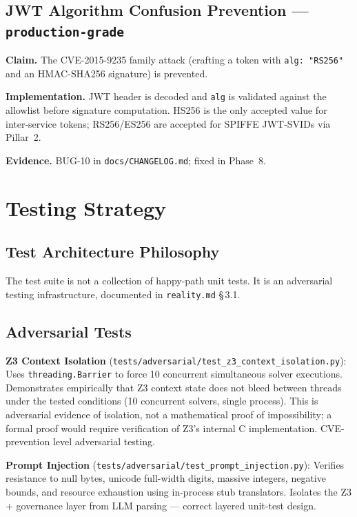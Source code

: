 \documentclass[12pt,a4paper,oneside]{report}
\newcommand{\fname}[1]{\texttt{#1}}          %
\newcommand{\code}[1]{\texttt{#1}}           %
\newcommand{\cfrsec}[1]{\S\,#1}             %
\begin{document}
\section{JWT Algorithm Confusion Prevention --- \code{production-grade}}

\textbf{Claim.}  The CVE-2015-9235 family attack (crafting a token with
\code{alg: "RS256"} and an HMAC-SHA256 signature) is prevented.

\textbf{Implementation.}  JWT header is decoded and \code{alg} is validated
against the allowlist before signature computation.  HS256 is the only
accepted value for inter-service tokens; RS256/ES256 are accepted for
SPIFFE JWT-SVIDs via Pillar~2.

\textbf{Evidence.}  BUG-10 in \fname{docs/CHANGELOG.md}; fixed in Phase~8.

\chapter{Testing Strategy}

\section{Test Architecture Philosophy}

The test suite is not a collection of happy-path unit tests. It is an
adversarial testing infrastructure, documented in \fname{reality.md}
\cfrsec{3.1}.

\section{Adversarial Tests}

\textbf{Z3 Context Isolation}
(\fname{tests/adversarial/test\_z3\_context\_isolation.py}): Uses
\code{threading.Barrier} to force 10 concurrent simultaneous solver executions.
Demonstrates empirically that Z3 context state does not bleed between threads
under the tested conditions (10 concurrent solvers, single process).  This is
adversarial evidence of isolation, not a mathematical proof of impossibility;
a formal proof would require verification of Z3's internal C implementation.
CVE-prevention level adversarial testing.

\textbf{Prompt Injection}
(\fname{tests/adversarial/test\_prompt\_injection.py}): Verifies resistance to
null bytes, unicode full-width digits, massive integers, negative bounds, and
resource exhaustion using in-process stub translators. Isolates the Z3 +
governance layer from LLM parsing --- correct layered unit-test design.
\end{document}
